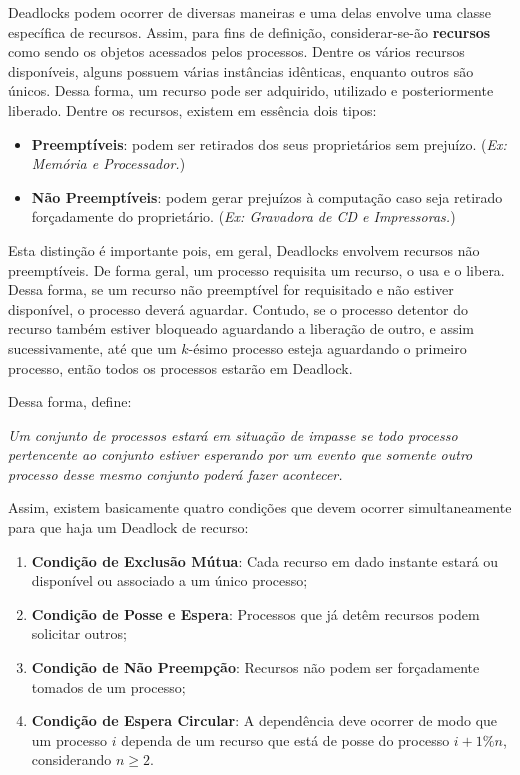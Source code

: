 	Deadlocks podem ocorrer de diversas maneiras e uma delas envolve uma classe específica de recursos. Assim, para fins de definição, considerar-se-ão \textbf{recursos} como sendo os objetos acessados pelos processos. Dentre os vários recursos disponíveis, alguns possuem várias instâncias idênticas, enquanto outros são únicos. Dessa forma, um recurso pode ser adquirido, utilizado e posteriormente liberado. Dentre os recursos, existem em essência dois tipos:
	\begin{itemize}
		\item \textbf{Preemptíveis}: podem ser retirados dos seus proprietários sem prejuízo. (\textit{Ex: Memória e Processador.})
		\item \textbf{Não Preemptíveis}: podem gerar prejuízos à computação caso seja retirado forçadamente do proprietário. (\textit{Ex: Gravadora de CD e Impressoras.})
	\end{itemize}
	Esta distinção é importante pois, em geral, Deadlocks envolvem recursos não preemptíveis. De forma geral, um processo requisita um recurso, o usa e o libera. Dessa forma, se um recurso não preemptível for requisitado e não estiver disponível, o processo deverá aguardar. Contudo, se o processo detentor do recurso também estiver bloqueado aguardando a liberação de outro, e assim sucessivamente, até que um $k$-ésimo processo esteja aguardando o primeiro processo, então todos os processos estarão em Deadlock.

	Dessa forma, \cite{livro:tenembaum} define:

	\textit{Um conjunto de processos estará em situação de impasse se todo processo pertencente ao conjunto estiver esperando por um evento que somente outro processo desse mesmo conjunto poderá fazer acontecer.}

	Assim, existem basicamente quatro condições que devem ocorrer simultaneamente para que haja um Deadlock de recurso:
	\begin{enumerate}
		\item \textbf{Condição de Exclusão Mútua}: Cada recurso em dado instante estará ou disponível ou associado a um único processo;
		\item \textbf{Condição de Posse e Espera}: Processos que já detêm recursos podem solicitar outros;
		\item \textbf{Condição de Não Preempção}: Recursos não podem ser forçadamente tomados de um processo;
		\item \textbf{Condição de Espera Circular}: A dependência deve ocorrer de modo que um processo $i$ dependa de um recurso que está de posse do processo $i+1 \% n$, considerando $n\geq2$.
	\end{enumerate}

